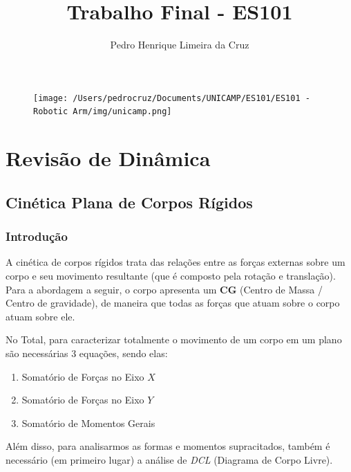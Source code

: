 \documentclass{article}
\author{Pedro Henrique Limeira da Cruz}
\title{Trabalho Final - ES101}
\begin{document}
    \maketitle
    \thispagestyle{empty}

    \begin{figure}[h]
        \begin{center}
            \texttt{[image: /Users/pedrocruz/Documents/UNICAMP/ES101/ES101 - Robotic Arm/img/unicamp.png]}
        \end{center}
    \end{figure}

    \newpage

    \section[Rev. Dinâmica]{Revisão de Dinâmica}

        \subsection{Cinética Plana de Corpos Rígidos}

            \subsubsection[Intro]{Introdução}
                A cinética de corpos rígidos trata das relações entre as forças externas sobre um corpo e seu movimento resultante (que é composto pela rotação e translação). Para a abordagem a seguir, o
                corpo apresenta um \textbf{CG} (Centro de Massa / Centro de gravidade), de maneira que todas as forças que atuam sobre o corpo atuam sobre ele.

                No Total, para caracterizar totalmente o movimento de um corpo em um plano são necessárias 3 equações, sendo elas:
                \begin{enumerate}
                    \item Somatório de Forças no Eixo $X$
                    \item Somatório de Forças no Eixo $Y$
                    \item Somatório de Momentos Gerais
                \end{enumerate}

                Além disso, para analisarmos as formas e momentos supracitados, também é necessário (em primeiro lugar) a análise de \emph{DCL} (Diagrama de Corpo Livre).
\end{document}
